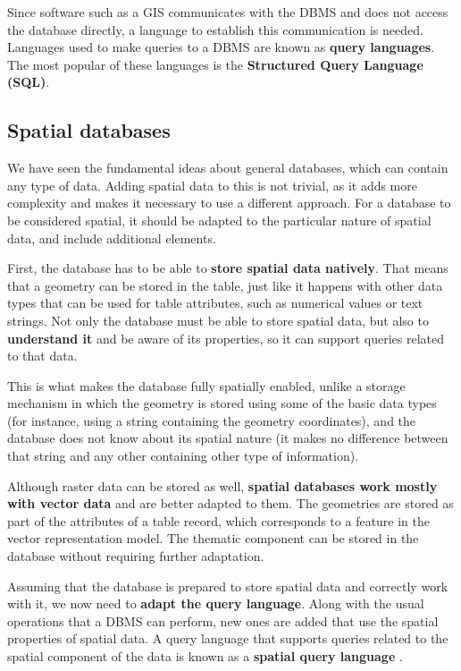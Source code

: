 Since software such as a GIS communicates with the DBMS and does not access the database directly, a language to establish this communication is needed. Languages used to make queries to a DBMS are known as \textbf{query languages}. The most popular of these languages is the \textbf{Structured Query Language (SQL)}.

\subsection{Spatial databases}

We have seen the fundamental ideas about general databases, which can contain any type of data. Adding spatial data to this is not trivial, as it adds more complexity and makes it necessary to use a different approach. For a database to be considered spatial, it should be adapted to the particular nature of spatial data, and include additional elements.

First, the database has to be able to \textbf{store spatial data natively}. That means that a geometry can be stored in the table, just like it happens with other data types that can be used for table attributes, such as numerical values or text strings. Not only the database must be able to store spatial data, but also to \textbf{understand it} and be aware of its properties, so it can support queries related to that data. 

This is what makes the database fully spatially enabled, unlike a storage mechanism in which the geometry is stored using some of the basic data types (for instance, using a string containing the geometry coordinates), and the database does not know about its spatial nature (it makes no difference between that string and any other containing other type of information).

Although raster data can be stored as well, \textbf{spatial databases work mostly with vector data} and are better adapted to them. The geometries are stored as part of the attributes of a table record, which corresponds to a feature in the vector representation model. The thematic component can be stored in the database without requiring further adaptation.

Assuming that the database is prepared to store spatial data and correctly work with it, we now need to \textbf{adapt the query language}. Along with the usual operations that a DBMS can perform, new ones are added that use the spatial properties of spatial data. A query language that supports queries related to the spatial component of the data is known as a \textbf{spatial query language} .


